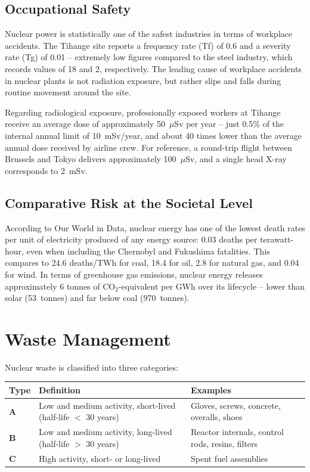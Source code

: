 \subsection{Occupational Safety}

Nuclear power is statistically one of the safest industries in terms of workplace accidents. The Tihange site reports a frequency rate (Tf) of 0.6 and a severity rate (Tg) of 0.01 -- extremely low figures compared to the steel industry, which records values of 18 and 2, respectively. The leading cause of workplace accidents in nuclear plants is not radiation exposure, but rather slips and falls during routine movement around the site.

Regarding radiological exposure, professionally exposed workers at Tihange receive an average dose of approximately 50~$\mu$Sv per year -- just 0.5\% of the internal annual limit of 10~mSv/year, and about 40 times lower than the average annual dose received by airline crew. For reference, a round-trip flight between Brussels and Tokyo delivers approximately 100~$\mu$Sv, and a single head X-ray corresponds to 2~mSv.

\subsection{Comparative Risk at the Societal Level}

According to Our World in Data, nuclear energy has one of the lowest death rates per unit of electricity produced of any energy source: 0.03 deaths per terawatt-hour, even when including the Chernobyl and Fukushima fatalities. This compares to 24.6 deaths/TWh for coal, 18.4 for oil, 2.8 for natural gas, and 0.04 for wind. In terms of greenhouse gas emissions, nuclear energy releases approximately 6 tonnes of CO$_2$-equivalent per GWh over its lifecycle -- lower than solar (53~tonnes) and far below coal (970~tonnes).

\section{Waste Management}

Nuclear waste is classified into three categories:

\begin{center}
\begin{tabular}{>{\bfseries}p{2cm}p{4.5cm}p{5.5cm}}
\toprule
Type & Definition & Examples \\
\midrule
A & Low and medium activity, short-lived (half-life $<$ 30 years) & Gloves, screws, concrete, overalls, shoes \\
B & Low and medium activity, long-lived (half-life $>$ 30 years)   & Reactor internals, control rods, resins, filters \\
C & High activity, short- or long-lived                             & Spent fuel assemblies \\
\bottomrule
\end{tabular}
\end{center}

